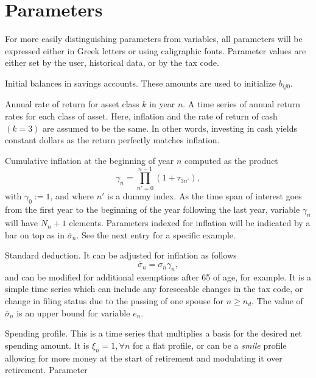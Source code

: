 \documentclass{report}[fleqn,11pt]
\begin{document}
\section{Parameters}
For more easily distinguishing parameters from variables, all parameters will be expressed
either in Greek letters or using caligraphic fonts.
Parameter values are either set by the user, historical data, or by the tax code.
\begin{description}[leftmargin=4em,style=multiline]
\item [$\beta_{ij}$]
	Initial balances in savings accounts. These amounts are used to initialize $b_{ij0}$.
\item [$\tau_{kn}$]
	Annual rate of return for asset class $k$ in year $n$.
	A time series of annual return rates for each class of asset.
	Here, inflation and the rate of return of cash $(k=3)$ are assumed to be the same.
	In other words, investing in cash yields constant dollars as the return perfectly
	matches inflation.
\item [$\gamma_n$]
	Cumulative inflation at the beginning of year $n$ computed as the product
	\begin{equation}
		\gamma_n = \prod_{n' = 0}^{n-1} (1 + \tau_{3n'}),
	\end{equation}
	with $\gamma_0 := 1$, and where $n'$ is a dummy index.
	As the time span of interest goes from the first year to the beginning
        of the year following the last year,
        variable $\gamma_n$ will have $N_n + 1$ elements.
	Parameters indexed for inflation will be indicated by a bar on top as in $\bar{\sigma}_n$.
	See the next entry for a specific example.
\item [$\sigma_n$]
	Standard deduction. It can be adjusted for inflation as follows
	\begin{equation}
		\bar\sigma_n = \sigma_n \gamma_n,
	\end{equation}
	and can be modified for additional exemptions after 65 of age, for example.
	It is a simple time series
	which can include any foreseeable changes in the tax code, or change in filing status due to the
	passing of one spouse for $n\ge n_d$.  The value of $\bar{\sigma}_n$ is an upper bound for variable $e_n$.
\item [$\xi_{n}$]
	Spending profile. This is a time series that multiplies a basis for the desired net spending amount.
	It is $\xi_n =1, \forall n$ for
	a flat profile, or can be a {\em smile} profile allowing for more money at the start
	of retirement and modulating it over retirement. Parameter

\end{description}
\end{document}
